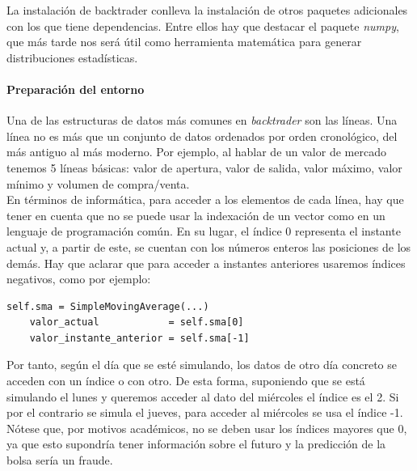 		La instalaci\'on de backtrader conlleva la instalaci\'on de otros paquetes adicionales con los que tiene dependencias. Entre ellos hay que destacar el paquete \textit{numpy}, que m\'as tarde nos ser\'a \'util como herramienta matem\'atica para generar distribuciones estad\'isticas.\\
		
		
		\paragraph{Preparaci\'on del entorno}
		
		Una de las estructuras de datos m\'as comunes en \textit{backtrader} son las l\'ineas. Una l\'inea no es m\'as que un conjunto de datos ordenados por orden cronol\'ogico, del m\'as antiguo al m\'as moderno. Por ejemplo, al hablar de un valor de mercado tenemos 5 l\'ineas b\'asicas: valor de apertura, valor de salida, valor m\'aximo, valor m\'inimo y volumen de compra/venta. \\
		
		En t\'erminos de inform\'atica, para acceder a los elementos de cada l\'inea, hay que tener en cuenta que no se puede usar la indexaci\'on de un vector como en un lenguaje de programaci\'on com\'un. En su lugar, el \'indice 0 representa el instante actual y, a partir de este, se cuentan con los n\'umeros enteros las posiciones de los dem\'as. Hay que aclarar que para acceder a instantes anteriores usaremos \'indices negativos, como por ejemplo:\\
		
		\begin{lstlisting}[basicstyle=\tiny]
	self.sma = SimpleMovingAverage(...)
	valor_actual            = self.sma[0]
	valor_instante_anterior = self.sma[-1]
		\end{lstlisting}
		
		\vspace{0.8cm}
		
		Por tanto, seg\'un el d\'ia que se est\'e simulando, los datos de otro d\'ia concreto se acceden con un \'indice o con otro. De esta forma, suponiendo que se est\'a simulando el lunes y queremos acceder al dato del mi\'ercoles el \'indice es el 2. Si por el contrario se simula el jueves, para acceder al mi\'ercoles se usa el \'indice -1. N\'otese que, por motivos acad\'emicos, no se deben usar los \'indices mayores que 0, ya que esto supondr\'ia tener informaci\'on sobre el futuro y la predicci\'on de la bolsa ser\'ia un fraude.\\
		
